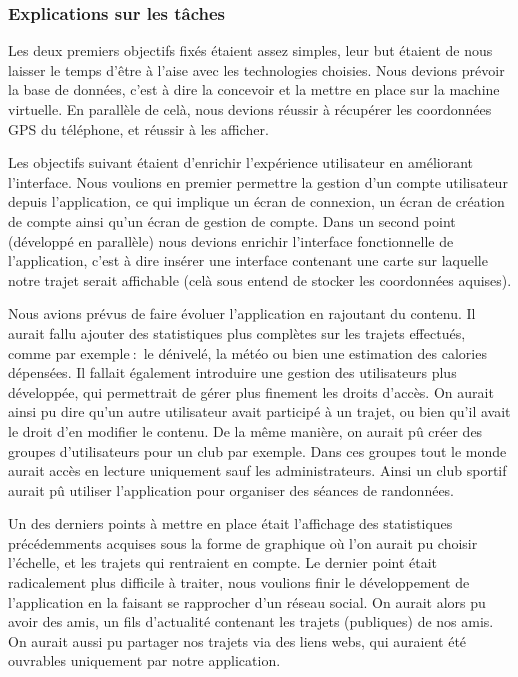 \subsubsection{Explications sur les tâches}
Les deux premiers objectifs fixés étaient assez simples, leur but étaient de nous laisser le temps d'être à l'aise avec les technologies choisies.
Nous devions prévoir la base de données, c'est à dire la concevoir et la mettre en place sur la machine virtuelle. En parallèle de celà, nous devions réussir à récupérer les coordonnées GPS du téléphone, et réussir à les afficher.
\par
Les objectifs suivant étaient d'enrichir l'expérience utilisateur en améliorant l'interface. Nous voulions en premier permettre la gestion d'un compte utilisateur depuis l'application, ce qui implique un écran de connexion, un écran de création de compte ainsi qu'un écran de gestion de compte.
Dans un second point (développé en parallèle) nous devions enrichir l'interface fonctionnelle de l'application, c'est à dire insérer une interface contenant une carte sur laquelle notre trajet serait affichable (celà sous entend de stocker les coordonnées aquises).
\par
Nous avions prévus de faire évoluer l'application en rajoutant du contenu. Il aurait fallu ajouter des statistiques plus complètes sur les trajets effectués, comme par exemple$\ :$ le dénivelé, la météo ou bien une estimation des calories dépensées.
Il fallait également introduire une gestion des utilisateurs plus développée, qui permettrait de gérer plus finement les droits d'accès. On aurait ainsi pu dire qu'un autre utilisateur avait participé à un trajet, ou bien qu'il avait le droit d'en modifier le contenu.
De la même manière, on aurait pû créer des groupes d'utilisateurs pour un club par exemple. Dans ces groupes tout le monde aurait accès en lecture uniquement sauf les administrateurs. Ainsi un club sportif aurait pû utiliser l'application pour organiser des séances de randonnées.
\par
Un des derniers points à mettre en place était l'affichage des statistiques précédemments acquises sous la forme de graphique où l'on aurait pu choisir l'échelle, et les trajets qui rentraient en compte.
Le dernier point était radicalement plus difficile à traiter, nous voulions finir le développement de l'application en la faisant se rapprocher d'un réseau social. On aurait alors pu avoir des amis, un fils d'actualité contenant les trajets (publiques) de nos amis. On aurait aussi pu partager
nos trajets via des liens webs, qui auraient été ouvrables uniquement par notre application.
